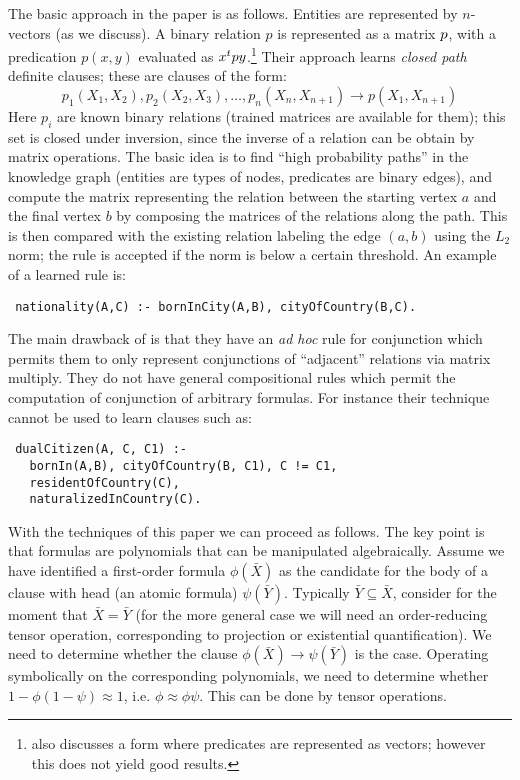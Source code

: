 \documentclass{article} %
\begin{document}
The basic approach in the paper is as follows. Entities are represented by $n$-vectors (as we discuss). A binary relation $p$ is represented as a matrix $p$, with a predication $p(x,y)$ evaluated as $x^t py$.\footnote{\cite{bishan-iclr15} also discusses a form where predicates are represented as vectors; however this does not yield good results.} Their approach learns {\em closed path} definite clauses; these are clauses of the form:
$$ p_1(X_1, X_2), p_2(X_2,X_3), \ldots, p_n(X_n, X_{n+1}) \rightarrow p(X_1, X_{n+1})$$
Here $p_i$ are known binary relations (trained matrices are available for them); this set is closed under inversion, since the inverse of a relation can be obtain by matrix operations. The basic idea is to find ``high probability paths'' in the knowledge graph (entities are types of nodes, predicates are binary edges), and compute the matrix representing the relation between the starting vertex $a$ and the final vertex $b$ by composing the matrices of the relations along the path. This is then compared with the existing relation labeling the edge $(a,b)$ using the $L_2$ norm; the rule is accepted if the norm is below a certain threshold. An example of a learned rule is:
\begin{lstlisting}
 nationality(A,C) :- bornInCity(A,B), cityOfCountry(B,C).
\end{lstlisting}

The main drawback of \cite{bishan-iclr15} is that they have an {\em ad hoc} rule for conjunction which permits them to only represent conjunctions of ``adjacent'' relations via matrix multiply. They do not have general compositional rules which permit the computation of conjunction of arbitrary formulas. For instance their technique cannot be used to learn clauses such as: 
\begin{lstlisting}
 dualCitizen(A, C, C1) :- 
   bornIn(A,B), cityOfCountry(B, C1), C != C1, 
   residentOfCountry(C), 
   naturalizedInCountry(C).
\end{lstlisting}
With the techniques of this paper we can proceed as follows. The key point is that formulas are polynomials that can be manipulated algebraically. Assume we have identified a first-order formula $\phi(\bar{X})$ as the candidate for the body of a clause with head (an atomic formula) $\psi(\bar{Y})$. Typically $\bar{Y}\subseteq \bar{X}$, consider for the moment that $\bar{X}=\bar{Y}$ (for the more general case we will need an order-reducing tensor operation, corresponding to projection or existential quantification). We need to determine whether the clause $\phi(\bar{X})\rightarrow \psi(\bar{Y})$ is the case. Operating symbolically on the corresponding polynomials, we need to determine whether $1-\phi(1-\psi) \approx 1$, i.e.{} $\phi \approx \phi\psi$. This can be done by tensor operations. 
\end{document}
